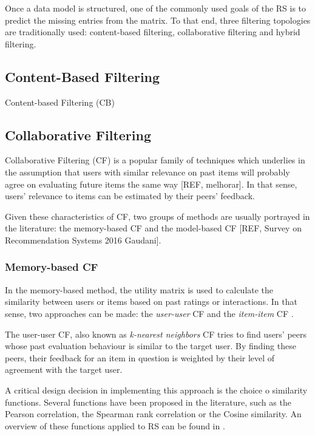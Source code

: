     Once a data model is structured, one of the commonly used goals of the RS is to predict the missing entries from the matrix. To that end, three filtering topologies are traditionally used: content-based filtering, collaborative filtering and hybrid filtering. 

\subsection{Content-Based Filtering}

Content-based Filtering (CB) 

\subsection{Collaborative Filtering}

    Collaborative Filtering (CF)  is a popular family of techniques which underlies in the assumption 
    that users with similar relevance on past items will probably agree on evaluating future items 
    the same way [REF, melhorar]. In that sense, users' relevance to items can be estimated by their
    peers' feedback.

    Given these characteristics of CF, two groups of methods are usually portrayed in the literature: 
    the memory-based CF and the model-based CF [REF, Survey on Recommendation Systems 2016 Gaudani]. 

  \subsubsection{Memory-based CF}

    In the memory-based method, the utility matrix is used to calculate the similarity between 
    users or items based on past ratings or interactions. In that sense, two approaches can be made:
    the \textit{user-user} CF and the \textit{item-item} CF \cite{2011ekstrand}. 
    
    The user-user CF, also known as \textit{k-nearest neighbors} CF tries to find users' peers 
    whose past evaluation behaviour is similar to the target user. By finding these peers, their 
    feedback for an item in question is weighted by their level of agreement with the target user.  
    
    A critical design decision in implementing this approach is the choice o similarity functions. 
    Several functions have been proposed in the literature, such as the Pearson correlation, the 
    Spearman rank correlation or the Cosine similarity. An overview of these functions applied to RS
    can be found in \cite{2011ekstrand}.
    
